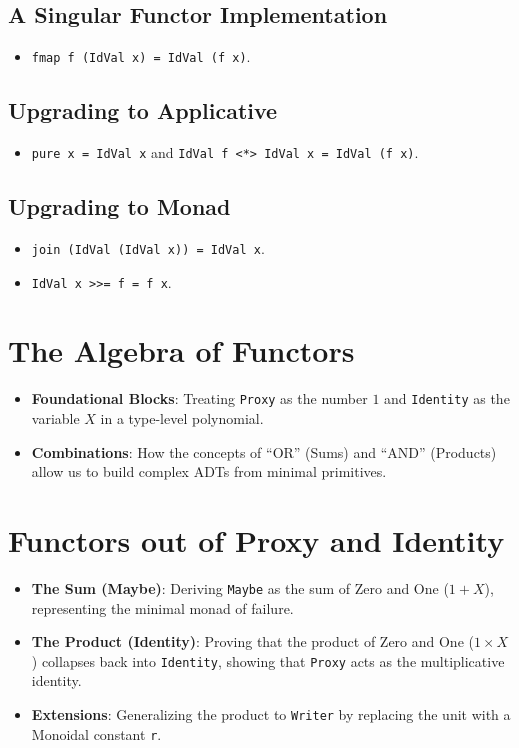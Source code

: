 \documentclass[12pt,a4paper]{article}
\begin{document}
\subsection{A Singular Functor Implementation}
\begin{itemize}
    \item \texttt{fmap f (IdVal x) = IdVal (f x)}.
\end{itemize}

\subsection{Upgrading to Applicative}
\begin{itemize}
    \item \texttt{pure x = IdVal x} and \texttt{IdVal f <*> IdVal x = IdVal (f x)}.
\end{itemize}

\subsection{Upgrading to Monad}
\begin{itemize}
    \item \texttt{join (IdVal (IdVal x)) = IdVal x}.
    \item \texttt{IdVal x >>= f = f x}.
\end{itemize}

\section{The Algebra of Functors}
\begin{itemize}
    \item \textbf{Foundational Blocks}: Treating \texttt{Proxy} as the number $1$ and \texttt{Identity} as the variable $X$ in a type-level polynomial.
    \item \textbf{Combinations}: How the concepts of ``OR'' (Sums) and ``AND'' (Products) allow us to build complex ADTs from minimal primitives.
\end{itemize}

\section{Functors out of Proxy and Identity}
\begin{itemize}
    \item \textbf{The Sum (Maybe)}: Deriving \texttt{Maybe} as the sum of Zero and One ($1 + X$), representing the minimal monad of failure.
    \item \textbf{The Product (Identity)}: Proving that the product of Zero and One ($1 \times X$) collapses back into \texttt{Identity}, showing that \texttt{Proxy} acts as the multiplicative identity.
    \item \textbf{Extensions}: Generalizing the product to \texttt{Writer} by replacing the unit with a Monoidal constant \texttt{r}.
\end{itemize}
\end{document}
